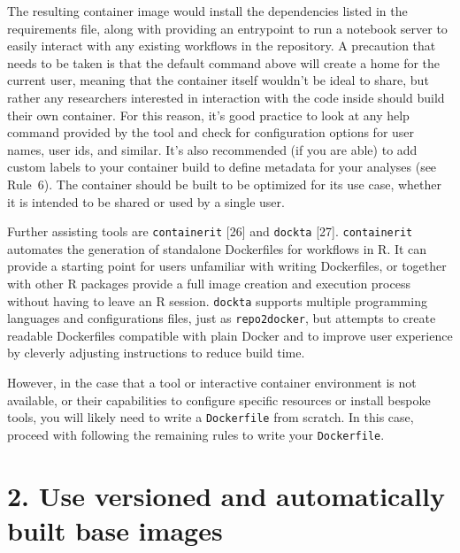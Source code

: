 \documentclass[10pt,letterpaper]{article}
\begin{document}
The resulting container image would install the dependencies listed in
the requirements file, along with providing an entrypoint to run a
notebook server to easily interact with any existing workflows in the
repository. A precaution that needs to be taken is that the default
command above will create a home for the current user, meaning that the
container itself wouldn't be ideal to share, but rather any researchers
interested in interaction with the code inside should build their own
container. For this reason, it's good practice to look at any help
command provided by the tool and check for configuration options for
user names, user ids, and similar. It's also recommended (if you are
able) to add custom labels to your container build to define metadata
for your analyses (see Rule~6). The container should be built to be
optimized for its use case, whether it is intended to be shared or used
by a single user.

Further assisting tools are \texttt{containerit} {[}26{]} and
\texttt{dockta} {[}27{]}. \texttt{containerit} automates the generation
of standalone Dockerfiles for workflows in R. It can provide a starting
point for users unfamiliar with writing Dockerfiles, or together with
other R packages provide a full image creation and execution process
without having to leave an R session. \texttt{dockta} supports multiple
programming languages and configurations files, just as
\texttt{repo2docker}, but attempts to create readable Dockerfiles
compatible with plain Docker and to improve user experience by cleverly
adjusting instructions to reduce build time.

However, in the case that a tool or interactive container environment is
not available, or their capabilities to configure specific resources or
install bespoke tools, you will likely need to write a
\texttt{Dockerfile} from scratch. In this case, proceed with following
the remaining rules to write your \texttt{Dockerfile}.

\hypertarget{use-versioned-and-automatically-built-base-images}{%
\section*{2. Use versioned and automatically built base
images}\label{use-versioned-and-automatically-built-base-images}}
\end{document}
